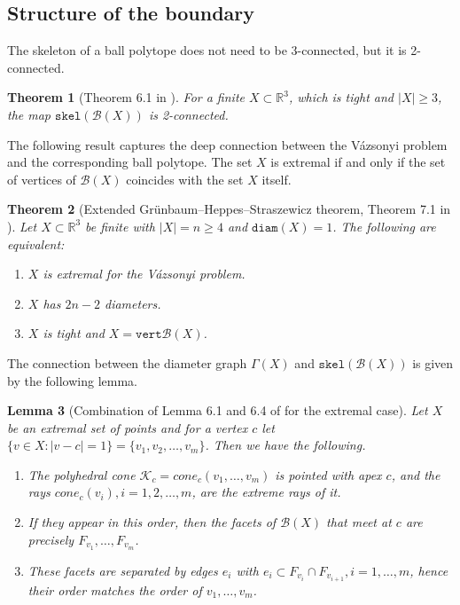 \documentclass[10pt,a4paper]{article}
\newtheorem{theorem}{Theorem}[section]
\newtheorem{lemma}[theorem]{Lemma}
\newcommand{\R}[0]{\mathbb{R}}
\newcommand{\Kc}[0]{\mathcal{K}}
\newcommand{\Bc}[0]{\mathcal{B}}
\newcommand{\skel}[0]{\mathtt{skel}}
\newcommand{\diam}[0]{\mathtt{diam}}
\newcommand{\vertices}[0]{\mathtt{vert}}
\newcommand{\cone}[0]{cone}
\begin{document}
\subsection{Structure of the boundary}
The skeleton of a ball polytope does not need to be 3-connected, but it is 2-connected.

\begin{theorem}[Theorem 6.1 in \cite{kupitz2010ball}]\label{thm:2connect}
For a finite $X\subset \R^3$, which is tight and $|X|\ge3$, the map \(\skel(\Bc(X))\) is 2-connected.
\end{theorem}

The following result captures the deep connection between the Vázsonyi problem and the corresponding ball polytope. The set $X$ is extremal if and only if the set of vertices of $\Bc(X)$ coincides with the set $X$ itself. 

\begin{theorem}[Extended Grünbaum--Heppes--Straszewicz theorem, Theorem 7.1 in \cite{kupitz2010ball}]\label{thm:extendedghs}
Let \(X\subset\R^3\) be finite with \(|X|=n\geq 4\) and \(\diam(X)=1\).  The
following are equivalent:
\begin{enumerate}[label=\textup{(\roman*)}]
    \item \(X\) is extremal for the Vázsonyi problem.
    \item $X$ has $2n-2$ diameters.
    \item \(X\) is tight and $X=\vertices \Bc(X)$.
    
\end{enumerate}
\end{theorem}



The connection between the diameter graph $\Gamma(X)$ and $\skel(\Bc(X))$ is given by the following lemma. 

\begin{lemma}[Combination of Lemma 6.1 and 6.4 of \cite{kupitz2010ball} for the extremal case]\label{lem:precise}
    Let $X$ be an extremal set of points and for a vertex $c$ let $\{v \in X : |v - c| = 1\} = \{v_1, v_2,\dots , v_m\}$. Then we have the following. 
    \begin{enumerate}
        \item[a)]  The polyhedral cone $\Kc_c=\cone_c(v_1, \dots , v_m)$ is pointed with apex $c$, and the rays $\cone_c(v_i), i = 1, 2, \dots , m$, are the extreme rays of it.
        \item[b)] If they appear in this order, then the facets of $\Bc(X)$ that meet at $c$ are precisely     \(F_{v_1},\ldots,F_{v_m}\).
        \item[c)] These facets are separated by edges $e_i$ with $e_i \subset F_{v_i}\cap F_{v_{i+1}} , i = 1, \dots , m$, hence their order matches the order of $v_1,\dots, v_m$.
    \end{enumerate}
    

\end{lemma}
\end{document}
